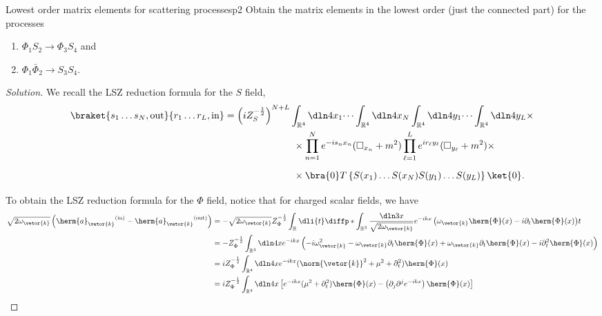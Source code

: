 \begin{problem}{Lowest order matrix elements for scattering processes}{p2}
   Obtain the matrix elements in the lowest order (just the connected part) for the processes
   \begin{enumerate}[label=(\alph*)]
       \item \(\Phi_1 S_2 \to \Phi_3 S_4\) and
       \item \(\Phi_1 \bar{\Phi}_2 \to S_3 S_4\).
   \end{enumerate}
\end{problem}
\begin{proof}[Solution]
   We recall the LSZ reduction formula for the \(S\) field,
   \begin{align*}
      \braket{s_1 \dots s_N\mathrm{, out}}{r_1 \dots r_L\mathrm{, in}} 
      &= \left(i Z_S^{-\frac12}\right)^{N + L} \int_{\mathbb{R}^4} \dln4{x_1} \dots \int_{\mathbb{R}^4} \dln4{x_N} \int_{\mathbb{R}^4} \dln4{y_1}\dots \int_{\mathbb{R}^4} \dln4{y_L} \times\\
      &{}\phantom{\left(i Z_S^{-\frac12}\right)^{N+L}\int_{\mathbb{R}^4}}\times \prod_{n = 1}^N e^{-i s_n x_n} (\square_{x_n} + m^2) \prod_{\ell = 1}^L e^{i r_\ell y_\ell} (\square_{y_\ell} + m^2) \times\\
      &{}\phantom{\left(i Z_S^{-\frac12}\right)^{N+L}\int_{\mathbb{R}^4}} \times \bra{0} T\left\{S(x_1)\dots S(x_N) S(y_1) \dots S(y_L)\right\}\ket{0}.
   \end{align*}
   To obtain the LSZ reduction formula for the \(\Phi\) field, notice that for charged scalar fields, we have
   \begin{align*}
      \sqrt{2 \omega_{\vetor{k}}} \left({\herm{a}_{\vetor{k}}}^{(\mathrm{in})} - {\herm{a}_{\vetor{k}}}^{(\mathrm{out})}\right)
      &= - \sqrt{2 \omega_{\vetor{k}}} Z_{\Phi}^{-\frac12} \int_{\mathbb{R}} \dli{t} \diffp*{\int_{\mathbb{R}^3} \frac{\dln3x}{\sqrt{2 \omega_{\vetor{k}}}} e^{-ikx} \left(\omega_{\vetor{k}} \herm{\Phi}(x) - i \partial_t \herm{\Phi}(x)\right)}{t}\\
      &= -Z_{\Phi}^{-\frac12} \int_{\mathbb{R}^4} \dln4x e^{-ikx} \left(-i \omega_{\vetor{k}}^2 - \omega_{\vetor{k}} \partial_t \herm{\Phi}(x) + \omega_{\vetor{k}} \partial_t \herm{\Phi}(x) - i \partial_t^2 \herm{\Phi}(x)\right)\\
      &= iZ_{\Phi}^{-\frac12} \int_{\mathbb{R}^4} \dln4x e^{-ikx} (\norm{\vetor{k}}^2 + \mu^2 + \partial_t^2)\herm{\Phi}(x)\\
      &= iZ_{\Phi}^{-\frac12} \int_{\mathbb{R}^4} \dln4x \left[e^{-ikx} (\mu^2 + \partial_t^2)\herm{\Phi}(x) - \left(\partial_j \partial^j e^{-ikx}\right)\herm{\Phi}(x)\right]\\

\end{align*}
\end{proof}
